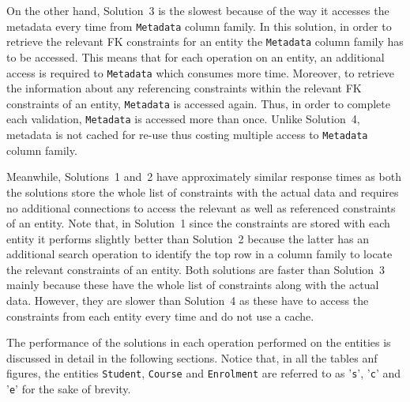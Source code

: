 On the other hand,  Solution~3 is the slowest  because of the
way it accesses the metadata every time from \texttt{Metadata} column family. 
In this solution,  in order to retrieve the relevant \ac{FK} constraints for
an entity the \texttt{Metadata} column family has to be accessed.  This means
that for each operation on an entity,  an additional access is required to
\texttt{Metadata} which consumes more time. 
Moreover,  to retrieve the information about any referencing constraints within
the relevant \ac{FK} constraints of an entity,  \texttt{Metadata} is accessed
again. 
Thus,  in order to
complete each validation,  \texttt{Metadata} is accessed more than once. 
Unlike Solution~4,  metadata is not cached for re-use thus costing multiple
access to \texttt{Metadata} column family. 

Meanwhile,  Solutions~1 and~2 have approximately similar response times as both
the solutions store the whole list of constraints with the actual data and 
requires no additional connections to access the relevant as well as
referenced constraints of an entity.  Note that, in Solution~1 since the constraints
are stored with each entity it performs slightly better than
Solution~2 because the latter has an additional search operation to identify the
top row in a column family to locate the relevant constraints of an entity.  Both
solutions are faster than Solution~3 mainly because these have the whole
list of constraints along with the actual data.  However,  they are slower than
Solution~4 as these have to access the constraints from each entity every time and do not
use a cache. 



The performance of the solutions in each
operation performed on the entities is discussed in detail in the following
sections.  Notice that,  in all the tables anf figures,   the
entities \texttt{Student},  \texttt{Course} and \texttt{Enrolment} are referred
to as '\texttt{s}',  '\texttt{c}' and '\texttt{e}' for the sake of brevity. 
